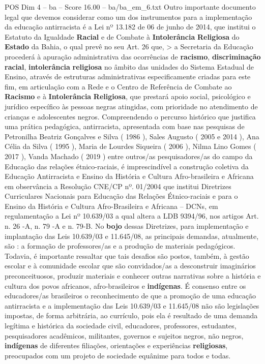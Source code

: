 \begin{textsample}{POS Dim 4 – ba – Score 16.00 – ba/ba\_em\_6.txt}
Outro importante documento legal que devemos considerar como um dos instrumentos para a implementação da educação antirracista é a Lei nº 13.182 de 06 de junho de 2014, que institui o Estatuto da Igualdade \textbf{Racial} e de Combate à \textbf{Intolerância} \textbf{Religiosa} do \textbf{Estado} da Bahia, o qual prevê no seu Art. 26 que, > a Secretaria da Educação procederá à apuração administrativa das ocorrências de \textbf{racismo}, \textbf{discriminação} \textbf{racial}, \textbf{intolerância} \textbf{religiosa} no âmbito das unidades do Sistema Estadual de Ensino, através de estruturas administrativas especificamente criadas para este fim, em articulação com a Rede e o Centro de Referência de Combate ao \textbf{Racismo} e à \textbf{Intolerância} \textbf{Religiosa}, que prestará apoio social, psicológico e jurídico específico às pessoas negras atingidas, com prioridade no atendimento de crianças e adolescentes negros.
Compreendendo o percurso histórico que justifica uma prática pedagógica, antirracista, apresentada com base nas pesquisas de Petronilha Beatriz Gonçalves e Silva ( 1986 ), Sales Augusto ( 2005 e 2014 ), Ana Célia da Silva ( 1995 ), Maria de Lourdes Siqueira ( 2006 ), Nilma Lino Gomes ( 2017 ), Vanda Machado ( 2019 ) entre outros/as pesquisadores/as do campo da Educação das relações étnico-raciais, é imprescindível a construção coletiva da Educação Antirracista e Ensino da História e Cultura Afro-brasileira e Africana em observância a Resolução CNE/CP nº. 01/2004 que institui Diretrizes Curriculares Nacionais para Educação das Relações Étnico-raciais e para o Ensino da História e Cultura Afro-Brasileira e Africana – DCNs, em regulamentação a Lei nº 10.639/03 a qual altera a LDB 9394/96, nos artigos Art. n. 26 -A, n. 79 -A e n. 79-B.
No \textbf{bojo} dessas Diretrizes, para implementação e implantação das Leis 10.639/03 e 11.645/08, as principais demandas, atualmente, são : a formação de professores/as e a produção de materiais pedagógicos.
Todavia, é importante ressaltar que tais desafios são postos, também, à gestão escolar e à comunidade escolar que são convidados/as a desconstruir imaginários preconceituosos, produzir materiais e conhecer outras narrativas sobre a história e cultura dos povos africanos, afro-brasileiros e \textbf{indígenas}.
É consenso entre os educadores/as brasileiros o reconhecimento de que a promoção de uma educação antirracista e a implementação das Leis 10.639/03 e 11.645/08 não são legislações impostas, de forma arbitrária, ao currículo, pois ela é resultado de uma demanda legítima e histórica da sociedade civil, educadores, professores, estudantes, pesquisadores acadêmicos, militantes, governos e sujeitos negros, não negros, \textbf{indígenas} de diferentes filiações, orientações e experiências \textbf{religiosas}, preocupados com um projeto de sociedade equânime para todos e todas.

\end{textsample}
